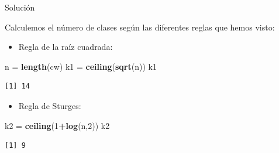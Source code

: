 \documentclass[
  ignorenonframetext,
]{beamer}
\newenvironment{Shaded}{\begin{snugshade}}{\end{snugshade}}
\newcommand{\DecValTok}[1]{\textcolor[rgb]{0.00,0.00,0.81}{#1}}
\newcommand{\KeywordTok}[1]{\textcolor[rgb]{0.13,0.29,0.53}{\textbf{#1}}}
\newcommand{\NormalTok}[1]{#1}
\newcommand{\OperatorTok}[1]{\textcolor[rgb]{0.81,0.36,0.00}{\textbf{#1}}}
\newcommand{\StringTok}[1]{\textcolor[rgb]{0.31,0.60,0.02}{#1}}
\providecommand{\tightlist}{%
  \setlength{\itemsep}{0pt}\setlength{\parskip}{0pt}}
\begin{document}
\begin{frame}[fragile]{Solución}
\protect\hypertarget{soluciuxf3n-1}{}

Calculemos el número de clases según las diferentes reglas que hemos
visto:

\begin{itemize}
\tightlist
\item
  Regla de la raíz cuadrada:
\end{itemize}

\begin{Shaded}
\begin{Highlighting}[]
\NormalTok{n =}\StringTok{ }\KeywordTok{length}\NormalTok{(cw)}
\NormalTok{k1 =}\StringTok{ }\KeywordTok{ceiling}\NormalTok{(}\KeywordTok{sqrt}\NormalTok{(n))}
\NormalTok{k1}
\end{Highlighting}
\end{Shaded}

\begin{verbatim}
[1] 14
\end{verbatim}

\begin{itemize}
\tightlist
\item
  Regla de Sturges:
\end{itemize}

\begin{Shaded}
\begin{Highlighting}[]
\NormalTok{k2 =}\StringTok{ }\KeywordTok{ceiling}\NormalTok{(}\DecValTok{1}\OperatorTok{+}\KeywordTok{log}\NormalTok{(n,}\DecValTok{2}\NormalTok{))}
\NormalTok{k2}
\end{Highlighting}
\end{Shaded}

\begin{verbatim}
[1] 9
\end{verbatim}

\end{frame}
\end{document}
